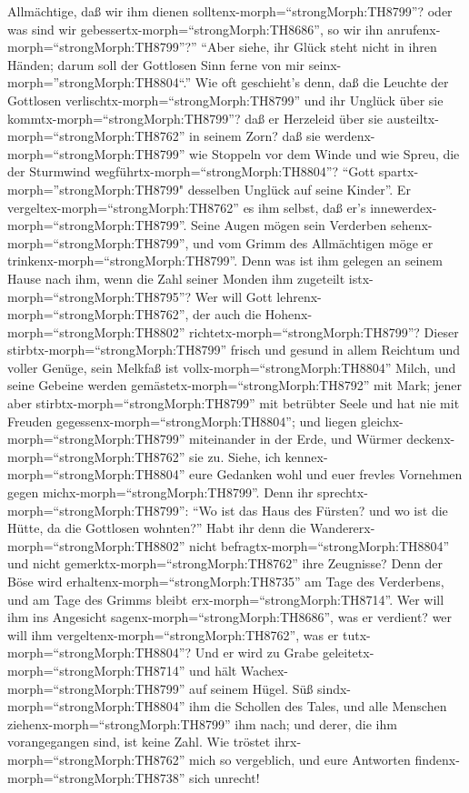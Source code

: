 Allmächtige, daß wir ihm dienen solltenx-morph=``strongMorph:TH8799''?
oder was sind wir gebessertx-morph=``strongMorph:TH8686'', so wir ihn
anrufenx-morph=``strongMorph:TH8799''?''  ``Aber siehe, ihr
Glück steht nicht in ihren Händen; darum soll der Gottlosen Sinn ferne
von mir seinx-morph=''strongMorph:TH8804``.''  Wie oft
geschieht's denn, daß die Leuchte der Gottlosen
verlischtx-morph=``strongMorph:TH8799'' und ihr Unglück über sie
kommtx-morph=``strongMorph:TH8799''? daß er Herzeleid über sie
austeiltx-morph=``strongMorph:TH8762'' in seinem Zorn?  daß
sie werdenx-morph=``strongMorph:TH8799'' wie Stoppeln vor dem Winde und
wie Spreu, die der Sturmwind wegführtx-morph=``strongMorph:TH8804''?
 ``Gott spartx-morph=''strongMorph:TH8799" desselben
Unglück auf seine Kinder''. Er vergeltex-morph=``strongMorph:TH8762'' es
ihm selbst, daß er's innewerdex-morph=``strongMorph:TH8799''.
 Seine Augen mögen sein Verderben
sehenx-morph=``strongMorph:TH8799'', und vom Grimm des Allmächtigen möge
er trinkenx-morph=``strongMorph:TH8799''.  Denn was ist ihm
gelegen an seinem Hause nach ihm, wenn die Zahl seiner Monden ihm
zugeteilt istx-morph=``strongMorph:TH8795''?  Wer will Gott
lehrenx-morph=``strongMorph:TH8762'', der auch die
Hohenx-morph=``strongMorph:TH8802''
richtetx-morph=``strongMorph:TH8799''?  Dieser
stirbtx-morph=``strongMorph:TH8799'' frisch und gesund in allem Reichtum
und voller Genüge,  sein Melkfaß ist
vollx-morph=``strongMorph:TH8804'' Milch, und seine Gebeine werden
gemästetx-morph=``strongMorph:TH8792'' mit Mark;  jener
aber stirbtx-morph=``strongMorph:TH8799'' mit betrübter Seele und hat
nie mit Freuden gegessenx-morph=``strongMorph:TH8804''; 
und liegen gleichx-morph=``strongMorph:TH8799'' miteinander in der Erde,
und Würmer deckenx-morph=``strongMorph:TH8762'' sie zu. 
Siehe, ich kennex-morph=``strongMorph:TH8804'' eure Gedanken wohl und
euer frevles Vornehmen gegen michx-morph=``strongMorph:TH8799''.
 Denn ihr sprechtx-morph=``strongMorph:TH8799'': ``Wo ist
das Haus des Fürsten? und wo ist die Hütte, da die Gottlosen wohnten?''
 Habt ihr denn die Wandererx-morph=``strongMorph:TH8802''
nicht befragtx-morph=``strongMorph:TH8804'' und nicht
gemerktx-morph=``strongMorph:TH8762'' ihre Zeugnisse?  Denn
der Böse wird erhaltenx-morph=``strongMorph:TH8735'' am Tage des
Verderbens, und am Tage des Grimms bleibt
erx-morph=``strongMorph:TH8714''.  Wer will ihm ins
Angesicht sagenx-morph=``strongMorph:TH8686'', was er verdient? wer will
ihm vergeltenx-morph=``strongMorph:TH8762'', was er
tutx-morph=``strongMorph:TH8804''?  Und er wird zu Grabe
geleitetx-morph=``strongMorph:TH8714'' und hält
Wachex-morph=``strongMorph:TH8799'' auf seinem Hügel.  Süß
sindx-morph=``strongMorph:TH8804'' ihm die Schollen des Tales, und alle
Menschen ziehenx-morph=``strongMorph:TH8799'' ihm nach; und derer, die
ihm vorangegangen sind, ist keine Zahl.  Wie tröstet
ihrx-morph=``strongMorph:TH8762'' mich so vergeblich, und eure Antworten
findenx-morph=``strongMorph:TH8738'' sich unrecht!

